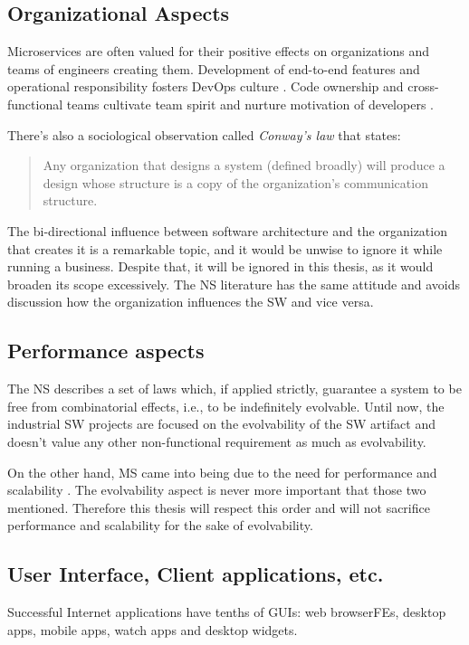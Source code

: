 \documentclass[thesis=M,english,hidelinks]{FITthesis}[2012/10/20]
\begin{document}
\subsection{Organizational Aspects}
Microservices are often valued for their positive effects on organizations and teams of engineers creating them. Development of end-to-end features and operational responsibility fosters DevOps culture \cite{devops-what-is}. Code ownership and cross-functional teams cultivate team spirit and nurture motivation of developers \cite{ms-fow-new-term-def, ms-modelling-with-petter, ms-building-ms}.

There's also a sociological observation called \textit{Conway's law} that states:
\begin{quote}
    Any organization that designs a system (defined broadly) will produce a design whose structure is a copy of the organization's communication structure.~\cite{conways-law}
\end{quote}

The bi-directional influence between software architecture and the organization that creates it is a remarkable topic, and it would be unwise to ignore it while running a business. Despite that, it will be ignored in this thesis, as it would broaden its scope excessively. The \acrshort{NS} literature \cite{ns-recreating, ns-toward-general-theory} has the same attitude and avoids discussion how the organization influences the \acrshort{SW} and vice versa.

\subsection{Performance aspects}
The \acrlong{NS} describes a set of laws which, if applied strictly, guarantee a system to be free from combinatorial effects, i.e., to be indefinitely evolvable. Until now, the industrial \acrlong{SW} projects \cite{ns-it-isnt-different, ns-exploring-defence} are focused on the evolvability of the \acrshort{SW} artifact and doesn't value any other non-functional requirement as much as evolvability.

On the other hand, \acrlong{MS} came into being due to the need for performance and scalability \cite{ms-building-ms, ms-evolutionary-arch}. The evolvability aspect is never more important that those two mentioned. Therefore this thesis will respect this order and will not sacrifice performance and scalability for the sake of evolvability.

\subsection{User Interface, Client applications, etc. }
Successful Internet applications have tenths of \acrshort{GUI}s: web browser\acrshort{FE}s, desktop apps, mobile apps, watch apps and desktop widgets. 
\end{document}
